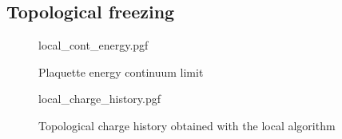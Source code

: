 \subsection{Topological freezing}

\begin{figure}[!htb]
    \centering
    {local_cont_energy.pgf}
    \caption{Plaquette energy continuum limit}
    \label{fig:local_cont_energy}
\end{figure}

\begin{figure}[!htb]
    \centering
    {local_charge_history.pgf}
    \caption{Topological charge history obtained with the local algorithm}
    \label{fig:local_charge_history}
\end{figure}



